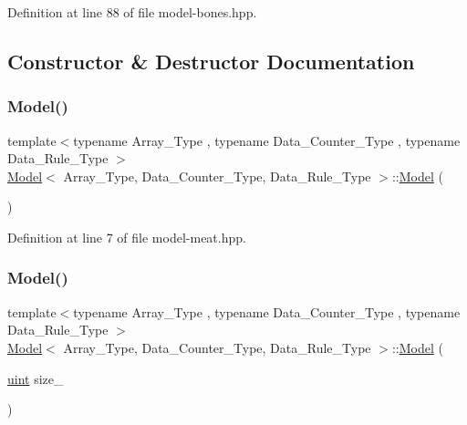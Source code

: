 Definition at line 88 of file model-\/bones.\+hpp.



\subsection{Constructor \& Destructor Documentation}
\mbox{\label{class_model_a29e6e0c37d9a892772c5ee95ce1e1043}} 
\subsubsection{\texorpdfstring{Model()}{Model()}\hspace{0.1cm}{\footnotesize\ttfamily [1/2]}}
{\footnotesize\ttfamily template$<$typename Array\+\_\+\+Type , typename Data\+\_\+\+Counter\+\_\+\+Type , typename Data\+\_\+\+Rule\+\_\+\+Type $>$ \\
\hyperlink{class_model}{Model}$<$ Array\+\_\+\+Type, Data\+\_\+\+Counter\+\_\+\+Type, Data\+\_\+\+Rule\+\_\+\+Type $>$\+::\hyperlink{class_model}{Model} (\begin{DoxyParamCaption}{ }\end{DoxyParamCaption})\hspace{0.3cm}{\ttfamily [inline]}}



Definition at line 7 of file model-\/meat.\+hpp.

\mbox{\label{class_model_a46639bb435ca2992dac8858528a5362e}} 
\subsubsection{\texorpdfstring{Model()}{Model()}\hspace{0.1cm}{\footnotesize\ttfamily [2/2]}}
{\footnotesize\ttfamily template$<$typename Array\+\_\+\+Type , typename Data\+\_\+\+Counter\+\_\+\+Type , typename Data\+\_\+\+Rule\+\_\+\+Type $>$ \\
\hyperlink{class_model}{Model}$<$ Array\+\_\+\+Type, Data\+\_\+\+Counter\+\_\+\+Type, Data\+\_\+\+Rule\+\_\+\+Type $>$\+::\hyperlink{class_model}{Model} (\begin{DoxyParamCaption}\item[{\hyperlink{typedefs_8hpp_a91ad9478d81a7aaf2593e8d9c3d06a14}{uint}}]{size\+\_\+ }\end{DoxyParamCaption})\hspace{0.3cm}{\ttfamily [inline]}}



